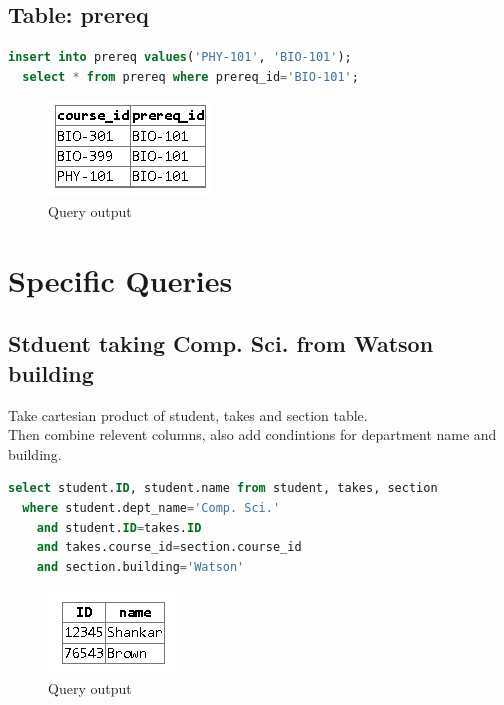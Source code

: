 \documentclass{article}
\begin{document}
\subsection{Table: prereq}
\begin{lstlisting}[language=sql]
  insert into prereq values('PHY-101', 'BIO-101');
  select * from prereq where prereq_id='BIO-101';
\end{lstlisting}
\begin{figure}[!ht]
  \begin{center}
  \includegraphics[scale=1]{ew.png}
  \caption{Query output}
  \end{center}
\end{figure}

\newpage
\section{Specific Queries}
\subsection{Stduent taking Comp. Sci. from Watson building}
Take cartesian product of student, takes and section table. \\
Then combine relevent columns, also add condintions for department name and building.
\begin{lstlisting}[language=sql]
  select student.ID, student.name from student, takes, section 
  where student.dept_name='Comp. Sci.' 
    and student.ID=takes.ID 
    and takes.course_id=section.course_id 
    and section.building='Watson'
\end{lstlisting}
\begin{figure}[!ht]
  \begin{center}
  \includegraphics[scale=1]{4_a.png}
  \caption{Query output}
  \end{center}
\end{figure}
\newpage
\end{document}
